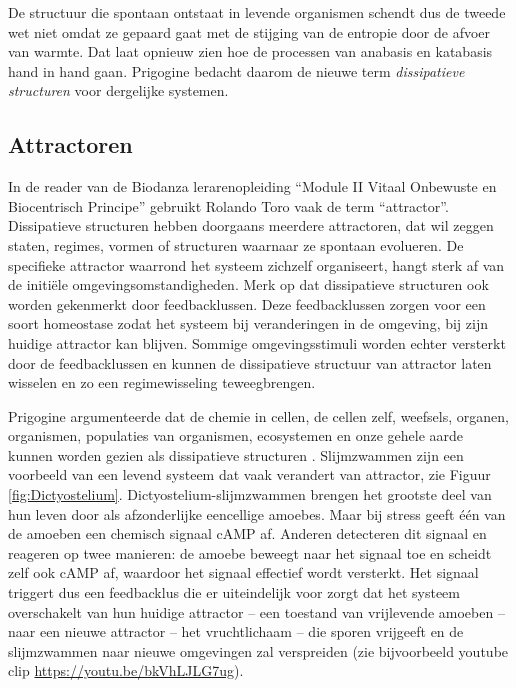 \documentclass[
  11pt,
]{book}
\begin{document}
De structuur die spontaan ontstaat in levende organismen schendt dus de tweede wet niet omdat ze gepaard gaat met de stijging van de entropie door de afvoer van warmte. Dat laat opnieuw zien hoe de processen van anabasis en katabasis hand in hand gaan. Prigogine bedacht daarom de nieuwe term \emph{dissipatieve structuren} voor dergelijke systemen.

\hypertarget{attractoren}{%
\subsection{Attractoren}\label{attractoren}}

In de reader van de Biodanza lerarenopleiding ``Module II Vitaal Onbewuste en Biocentrisch Principe'' gebruikt Rolando Toro vaak de term ``attractor''. Dissipatieve structuren hebben doorgaans meerdere attractoren, dat wil zeggen staten, regimes, vormen of structuren waarnaar ze spontaan evolueren. De specifieke attractor waarrond het systeem zichzelf organiseert, hangt sterk af van de initiële omgevingsomstandigheden. Merk op dat dissipatieve structuren ook worden gekenmerkt door feedbacklussen. Deze feedbacklussen zorgen voor een soort homeostase zodat het systeem bij veranderingen in de omgeving, bij zijn huidige attractor kan blijven. Sommige omgevingsstimuli worden echter versterkt door de feedbacklussen en kunnen de dissipatieve structuur van attractor laten wisselen en zo een regimewisseling teweegbrengen.

Prigogine argumenteerde dat de chemie in cellen, de cellen zelf, weefsels, organen, organismen, populaties van organismen, ecosystemen en onze gehele aarde kunnen worden gezien als dissipatieve structuren \citep{prigogineStengers1984}.
Slijmzwammen zijn een voorbeeld van een levend systeem dat vaak verandert van attractor, zie Figuur \ref{fig:Dictyostelium}. Dictyostelium-slijmzwammen brengen het grootste deel van hun leven door als afzonderlijke eencellige amoebes. Maar bij stress geeft één van de amoeben een chemisch signaal cAMP af. Anderen detecteren dit signaal en reageren op twee manieren: de amoebe beweegt naar het signaal toe en scheidt zelf ook cAMP af, waardoor het signaal effectief wordt versterkt. Het signaal triggert dus een feedbacklus die er uiteindelijk voor zorgt dat het systeem overschakelt van hun huidige attractor -- een toestand van vrijlevende amoeben -- naar een nieuwe attractor -- het vruchtlichaam -- die sporen vrijgeeft en de slijmzwammen naar nieuwe omgevingen zal verspreiden (zie bijvoorbeeld youtube clip \url{https://youtu.be/bkVhLJLG7ug}).
\end{document}
